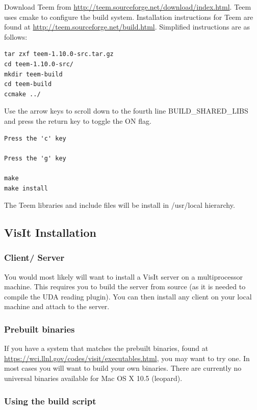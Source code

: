 \documentclass[12pt]{article}
\begin{document}
Download Teem from
\url{http://teem.sourceforge.net/download/index.html}.  Teem uses
cmake to configure the build system. Installation instructions for
Teem are found at \url{http://teem.sourceforge.net/build.html}.  Simplified
instructions are as follows:

\begin{verbatim}
tar zxf teem-1.10.0-src.tar.gz
cd teem-1.10.0-src/
mkdir teem-build
cd teem-build
ccmake ../
\end{verbatim}

Use the arrow keys to scroll down to the fourth line
BUILD\_SHARED\_LIBS and press the return key to toggle the ON flag.

\begin{verbatim}
Press the 'c' key

Press the 'g' key

make
make install
\end{verbatim}
The Teem libraries and include files will be install in /usr/local hierarchy.

\subsection{VisIt Installation}

\subsubsection{Client/ Server}
\label{subsec:ClientServer}

You would most likely will want to install a VisIt server on a
multiprocessor machine. This requires you to build the server from
source (as it is needed to compile the UDA reading plugin). You can
then install any client on your local machine and attach to the
server.

\subsubsection{Prebuilt binaries}
\label{subsec:PrebuiltBinaries}

If you have a system that matches the prebuilt binaries, found at
\url{https://wci.llnl.gov/codes/visit/executables.html}, you may want
to try one. In most cases you will want to build your own
binaries. There are currently no universal binaries available for Mac
OS X 10.5 (leopard).

\subsubsection{Using the build script}
\label{subsec:UsingTheBuildScript}
\end{document}

